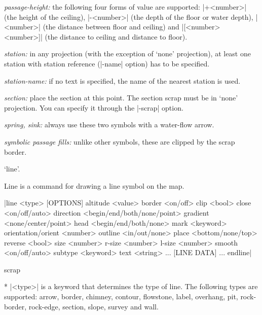       {\it passage-height:} the following four forms of value are supported:
      |+<number>| (the height of the ceiling), |-<number>| (the depth of the 
      floor or water depth), |<number>| (the distance between floor 
      and ceiling) and |[<number> <number>]| (the distance to ceiling and 
      distance to floor).
        
      {\it station:} in any projection (with the exception of `none' projection),
      at least one station with station reference (|-name| option) has 
      to be specified.
        
      {\it station-name:} if no text is specified, the name of the nearest
      station is used.
        
      {\it section:} place the section at this point. The section scrap
      must be in `none' projection. You can specify it through the |-scrap|
      option.
        
      {\it spring, sink:} always use these two symbols with a water-flow
      arrow.
        
      {\it symbolic passage fills:} unlike other symbols, these are
      clipped by the scrap border.
  \endlist
\endnotes


\subsubchapter `line'.

\description
Line is a command for drawing a line symbol on the map.
\enddescription

\syntax
  |line <type> [OPTIONS]
         altitude <value>
         border <on/off>
         clip <bool>
         close <on/off/auto>
         direction <begin/end/both/none/point>
         gradient <none/center/point>
         head <begin/end/both/none>
         mark <keyword>
         orientation/orient <number>
         outline <in/out/none>
         place <bottom/none/top>
         reverse <bool>
         size <number>
         r-size <number>
         l-size <number>
         smooth <on/off/auto>
         subtype <keyword>
         text <string>
         ...
         [LINE DATA]
         ...
       endline|
\endsyntax

\context
  scrap
\endcontext

\arguments
   * |<type>| is a keyword that determines the type of line.
     The following types are supported: arrow, border, chimney,
     contour, flowstone, label, overhang, pit, rock-border,
     rock-edge, section, slope, survey and wall.
\endarguments


